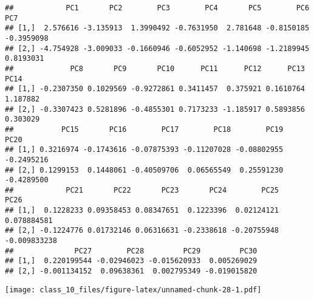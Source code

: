 \documentclass[
]{article}
\newenvironment{Shaded}{\begin{snugshade}}{\end{snugshade}}
\newcommand{\DataTypeTok}[1]{\textcolor[rgb]{0.13,0.29,0.53}{#1}}
\newcommand{\DecValTok}[1]{\textcolor[rgb]{0.00,0.00,0.81}{#1}}
\newcommand{\KeywordTok}[1]{\textcolor[rgb]{0.13,0.29,0.53}{\textbf{#1}}}
\newcommand{\NormalTok}[1]{#1}
\newcommand{\OperatorTok}[1]{\textcolor[rgb]{0.81,0.36,0.00}{\textbf{#1}}}
\newcommand{\StringTok}[1]{\textcolor[rgb]{0.31,0.60,0.02}{#1}}
\begin{document}
\begin{verbatim}
##            PC1       PC2        PC3        PC4       PC5        PC6        PC7
## [1,]  2.576616 -3.135913  1.3990492 -0.7631950  2.781648 -0.8150185 -0.3959098
## [2,] -4.754928 -3.009033 -0.1660946 -0.6052952 -1.140698 -1.2189945  0.8193031
##             PC8       PC9       PC10      PC11      PC12      PC13     PC14
## [1,] -0.2307350 0.1029569 -0.9272861 0.3411457  0.375921 0.1610764 1.187882
## [2,] -0.3307423 0.5281896 -0.4855301 0.7173233 -1.185917 0.5893856 0.303029
##           PC15       PC16        PC17        PC18        PC19       PC20
## [1,] 0.3216974 -0.1743616 -0.07875393 -0.11207028 -0.08802955 -0.2495216
## [2,] 0.1299153  0.1448061 -0.40509706  0.06565549  0.25591230 -0.4289500
##            PC21       PC22       PC23       PC24        PC25         PC26
## [1,]  0.1228233 0.09358453 0.08347651  0.1223396  0.02124121  0.078884581
## [2,] -0.1224776 0.01732146 0.06316631 -0.2338618 -0.20755948 -0.009833238
##              PC27        PC28         PC29         PC30
## [1,]  0.220199544 -0.02946023 -0.015620933  0.005269029
## [2,] -0.001134152  0.09638361  0.002795349 -0.019015820
\end{verbatim}

\begin{Shaded}
\end{Shaded}

\texttt{[image: class\_10\_files/figure-latex/unnamed-chunk-28-1.pdf]}
\end{document}
